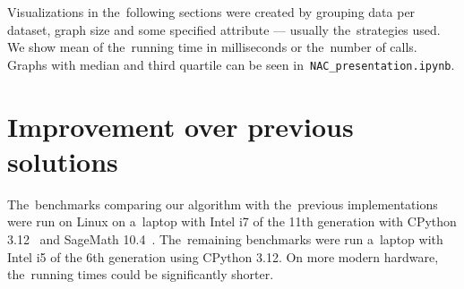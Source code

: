 Visualizations in the~following sections were created by grouping data per dataset,
graph size and some specified attribute --- usually the~strategies used.
%
We show mean of the~running time in milliseconds or
the~number of \IsNACColoring{} calls.
%
Graphs with median and third quartile can be seen in~\texttt{NAC\_presentation.ipynb}.


\section{Improvement over previous solutions}

The~benchmarks comparing our algorithm with the~previous implementations
were run on Linux on a~laptop with Intel i7 of the 11th generation
with CPython 3.12~\cite{cpython} and SageMath 10.4~\cite{sagemath}.
The~remaining benchmarks were run a~laptop with Intel i5 of the 6th generation
using CPython 3.12.
On more modern hardware, the~running times could be significantly shorter.

